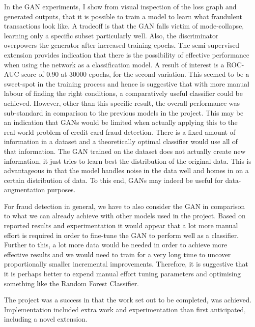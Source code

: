 \documentclass[12pt,a4paper,twoside]{report}
\begin{document}
In the GAN experiments, I show from visual inspection of the loss graph and generated outputs, that it is possible to train a model to learn what fraudulent transactions look like. A tradeoff is that the GAN falls victim of mode-collapse, learning only a specific subset particularly well. Also, the discriminator overpowers the generator after increased training epochs. The semi-supervised extension provides indication that there is the possibility of effective performance when using the network as a classification model. A result of interest is a ROC-AUC score of 0.90 at 30000 epochs, for the second variation. This seemed to be a sweet-spot in the training process and hence is suggestive that with more manual labour of finding the right conditions, a comparatively useful classifier could be achieved. However, other than this specific result, the overall performance was sub-standard in comparison to the previous models in the project. This may be an indication that GANs would be limited when actually applying this to the real-world problem of credit card fraud detection. There is a fixed amount of information in a dataset and a theoretically optimal classifier would use all of that information. The GAN trained on the dataset does not actually create new information, it just tries to learn best the distribution of the original data. This is advantageous in that the model handles noise in the data well and homes in on a certain distribution of data. To this end, GANs may indeed be useful for data-augmentation purposes. 

For fraud detection in general, we have to also consider the GAN in comparison to what we can already achieve with other models used in the project. Based on reported results and experimentation it would appear that a lot more manual effort is required in order to fine-tune the GAN to perform well as a classifier. Further to this, a lot more data would be needed in order to achieve more effective results and we would need to train for a very long time to uncover proportionally smaller incremental improvements. Therefore, it is suggestive that it is perhaps better to expend manual effort tuning parameters and optimising something like the Random Forest Classifier. 

The project was a success in that the work set out to be completed, was achieved. Implementation included extra work and experimentation than first anticipated, including a novel extension. 



\newpage
{}


\end{document}
